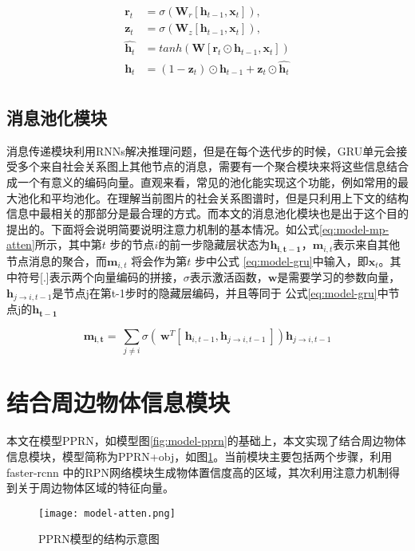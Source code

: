 \begin{equation} \label{eq:model-gru}
\begin{split}
\bm{r}_t &=  \sigma(\bm{W}_{r}[\bm{h}_{t-1}, \bm{x}_t]), \\
\bm{z}_t &=  \sigma(\bm{W}_{z}[\bm{h}_{t-1}, \bm{x}_t]), \\
\hat{\bm{h}_t} &= tanh(\bm{W}[\bm{r}_t \odot \bm{h}_{t-1}, \bm{x}_{t}])\\
\bm{h}_t &= (1 - \bm{z}_t) \odot \bm{h}_{t - 1} + \bm{z}_t \odot \hat{\bm{h}_t} \\
\end{split}
\end{equation}

\subsection{消息池化模块}

消息传递模块利用RNNs解决推理问题，但是在每个迭代步的时候，GRU单元会接受多个来自社会关系图上其他节点的消息，需要有一个聚合模块来将这些信息结合成一个有意义的编码向量。直观来看，常见的池化能实现这个功能，例如常用的最大池化和平均池化。在理解当前图片的社会关系图谱时，但是只利用上下文的结构信息中最相关的那部分是最合理的方式。而本文的消息池化模块也是出于这个目的提出的。下面将会说明简要说明注意力机制的基本情况。如公式\ref{eq:model-mp-atten}所示，其中第$t$ 步的节点$i$的前一步隐藏层状态为$\mathbf{h_{i,t-1}}$，$\mathbf{m}_{i,t}$表示来自其他节点消息的聚合，而$\bm{m}_{i,t}$ 将会作为第$t$ 步中公式
\ref{eq:model-gru}中输入，即$\mathbf{x}_{t}$。其中符号[.]表示两个向量编码的拼接，$\sigma$表示激活函数，$\bm{w}$是需要学习的参数向量，$\bm{h}_{j \to i,t-1}$是节点j在第t-1步时的隐藏层编码，并且等同于
公式\ref{eq:model-gru}中节点j的$\mathbf{h_{t-1}}$

\begin{equation}
    \label{eq:model-mp-atten}
	\bm{m_{i,t}} = ~\sum_{j\neq i} \sigma{(~\bm{w}^T[~\bm{h}_{i,t-1},\bm{h}_{j \to i,t-1}~]) \bm{h}_{j \to i,t-1}}	
\end{equation}


\section{结合周边物体信息模块}

本文在模型PPRN，如模型图\ref{fig:model-pprn}的基础上，本文实现了结合周边物体信息模块，模型简称为PPRN+obj，如图\ref{fig:model-atten}。当前模块主要包括两个步骤，利用faster-rcnn 中的RPN网络模块生成物体置信度高的区域，其次利用注意力机制得到关于周边物体区域的特征向量。
\begin{figure}[htpb]
	\centering
	\texttt{[image: model-atten.png]}
    \caption{PPRN模型的结构示意图}
	\vspace*{-3.5mm}
	\label{fig:model-atten}
\end{figure}

